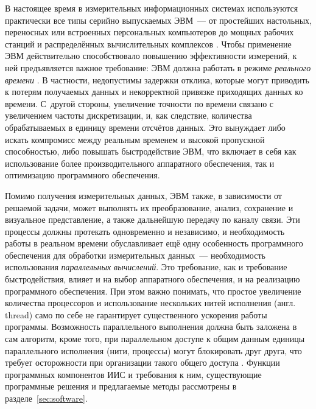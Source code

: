 \documentclass[a4paper, 14pt, titlepage]{extarticle}
\newcommand{\eng}[1]{\foreignlanguage{english}{#1}}
\newcommand{\term}[1]{\emph{#1}}
\begin{document}
  В настоящее время в измерительных информационных системах используются практически все типы
  серийно выпускаемых ЭВМ~--- от простейших настольных, переносных или встроенных персональных
  компьютеров до мощных рабочих станций и распределённых вычислительных комплексов \cite[с.~149]{rannev-iis}.
  Чтобы применение ЭВМ действительно способствовало повышению эффективности измерений, к ней
  предъявляется важное требование: ЭВМ должна работать в режиме \term{реального времени}
  \cite{tessier-reconfigurable}. В частности, недопустимы задержки отклика, которые могут приводить
  к потерям получаемых данных и некорректной привязке приходящих данных ко времени. С~другой
  стороны, увеличение точности по времени связано с увеличением частоты дискретизации, и, как
  следствие, количества обрабатываемых в единицу времени отсчётов данных. Это вынуждает либо искать
  компромисс между реальным временем и высокой пропускной способностью, либо повышать быстродействие
  ЭВМ, что включает в себя как использование более производительного аппаратного обеспечения, так и
  оптимизацию программного обеспечения.

  Помимо получения измерительных данных, ЭВМ также, в зависимости от решаемой задачи, может
  выполнять их преобразование, анализ, сохранение и визуальное представление, а также дальнейшую
  передачу по каналу связи. Эти процессы должны протекать одновременно и независимо, и необходимость
  работы в реальном времени обуславливает ещё одну особенность программного обеспечения для обработки измерительных данных~---
  необходимость использования \term{параллельных вычислений}. Это требование, как и требование
  быстродействия, влияет и на выбор аппаратного обеспечения, и на реализацию программного обеспечения.
  При этом важно понимать, что простое увеличение количества процессоров и использование
  нескольких нитей исполнения (англ. \eng{thread}) само по себе не гарантирует существенного ускорения работы программы. Возможность
  параллельного выполнения должна быть заложена в сам алгоритм, кроме того, при параллельном доступе
  к общим данным единицы параллельного исполнения (нити, процессы) могут блокировать друг друга, что
  требует осторожности при организации такого общего доступа \cite{hoare-csp}.
  Функции программных компонентов ИИС и требования к ним, существующие программные решения и
  предлагаемые методы рассмотрены в разделе~\ref{sec:software}.
\end{document}
